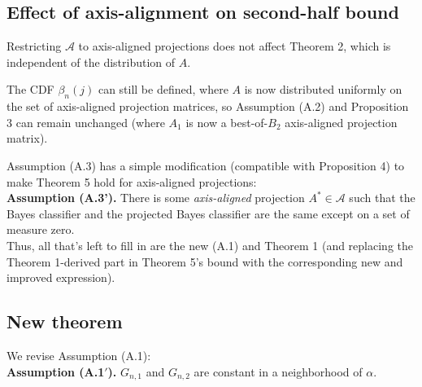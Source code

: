 \documentclass[ejs,preprint]{imsart}
\begin{document}
%
%
%
%
%

\subsection{Effect of axis-alignment on second-half bound}

Restricting $\mathcal A$ to axis-aligned projections does not affect Theorem 2, which is independent of the distribution of $A$.

The CDF $\beta_{n}(j)$ can still be defined, where $A$ is now distributed
uniformly on the set of axis-aligned projection matrices, so Assumption
(A.2) and Proposition 3 can remain unchanged (where $A_{1}$ is now
a best-of-$B_{2}$ axis-aligned projection matrix).

Assumption (A.3) has a simple modification (compatible with Proposition
4) to make Theorem 5 hold for axis-aligned projections:\\


\noindent \textbf{Assumption (A.3').} There is some \emph{axis-aligned}
projection $A^{*}\in\mathcal{A}$ such that the Bayes classifier and
the projected Bayes classifier are the same except on a set of measure
zero.\\


Thus, all that's left to fill in are the new (A.1) and Theorem 1 (and
replacing the Theorem 1-derived part in Theorem 5's bound with the
corresponding new and improved expression).


\subsection{New theorem}

We revise Assumption (A.1):\\

\noindent \textbf{Assumption (A.1$'$).} $G_{n,1}$ and $G_{n,2}$ are
constant in a neighborhood of $\alpha$.\\
\end{document}

